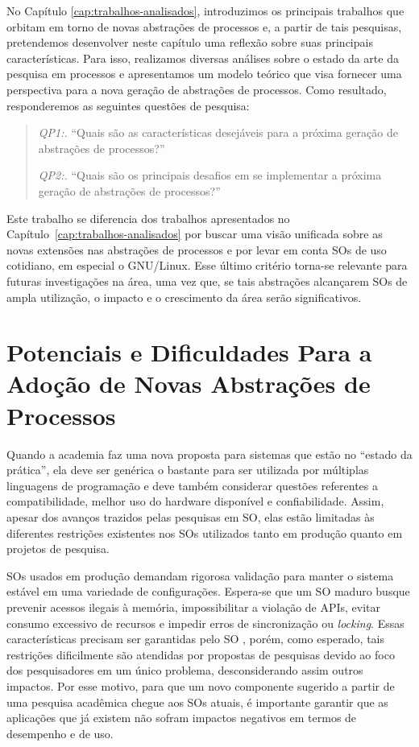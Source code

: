 \label{cap:analise-sobre-abstracoes-de-processos}

No Capítulo \ref{cap:trabalhos-analisados}, introduzimos os principais trabalhos
que orbitam em torno de novas abstrações de processos e, a partir de tais
pesquisas, pretendemos desenvolver neste capítulo uma reflexão sobre suas principais
características. Para isso, realizamos diversas análises sobre o estado da arte
da pesquisa em processos e apresentamos um modelo teórico que visa fornecer
uma perspectiva para a nova geração de abstrações de processos. Como resultado,
responderemos as seguintes questões de pesquisa:

\begin{quote}
 \item \textit{QP1:.} ``Quais são as características desejáveis para a próxima geração de abstrações de processos?''
 \item \textit{QP2:.} ``Quais são os principais desafios em se implementar a próxima geração de abstrações de processos?''
\end{quote}

Este trabalho se diferencia dos trabalhos apresentados no
Capítulo~\ref{cap:trabalhos-analisados} por buscar uma visão unificada sobre as
novas extensões nas abstrações de processos e por levar em conta SOs de uso
cotidiano, em especial o GNU/Linux. Esse último critério torna-se relevante
para futuras investigações na área, uma vez que, se tais abstrações alcançarem
SOs de ampla utilização, o impacto e o crescimento da área serão significativos.

\section{Potenciais e Dificuldades Para a Adoção de Novas Abstrações de Processos}
\label{sec:potenciais}
Quando a academia faz uma nova proposta para sistemas que estão no ``estado da
prática'', ela deve ser genérica o bastante para ser utilizada por
múltiplas linguagens de programação e deve também considerar questões
referentes a compatibilidade, melhor uso do hardware disponível e
confiabilidade. Assim, apesar dos avanços trazidos pelas pesquisas em SO, elas
estão limitadas às diferentes restrições existentes nos SOs utilizados tanto em
produção quanto em projetos de pesquisa.

SOs usados em produção demandam rigorosa validação para manter o sistema
estável em uma variedade de configurações. Espera-se que um SO maduro busque
prevenir acessos ilegais à memória, impossibilitar a violação de APIs, evitar
consumo excessivo de recursos e impedir erros de sincronização ou
\textit{locking}. Essas características precisam ser garantidas pelo SO
\citep{mondrix}, porém, como esperado, tais restrições dificilmente são
atendidas por propostas de pesquisas devido ao foco dos pesquisadores
em um único problema, desconsiderando assim outros impactos. Por esse motivo,
para que um novo componente sugerido a partir de uma pesquisa acadêmica chegue
aos SOs atuais, é importante garantir que as aplicações que já existem não
sofram impactos negativos em termos de desempenho e de uso.

